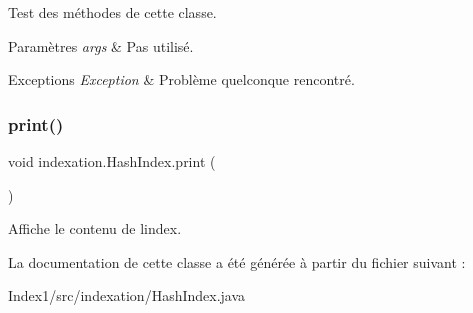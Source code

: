 Test des méthodes de cette classe.


\begin{DoxyParams}{Paramètres}
{\em args} & Pas utilisé.\\
\hline
\end{DoxyParams}

\begin{DoxyExceptions}{Exceptions}
{\em Exception} & Problème quelconque rencontré. \\
\hline
\end{DoxyExceptions}
\mbox{\label{classindexation_1_1HashIndex_a759834eb6bae4e2ab1d37ddb2f1aa840}} 
\subsubsection{\texorpdfstring{print()}{print()}}
{\footnotesize\ttfamily void indexation.\+Hash\+Index.\+print (\begin{DoxyParamCaption}{ }\end{DoxyParamCaption})}

Affiche le contenu de l\textquotesingle{}index. 

La documentation de cette classe a été générée à partir du fichier suivant \+:\begin{DoxyCompactItemize}
\item 
Index1/src/indexation/Hash\+Index.\+java\end{DoxyCompactItemize}
